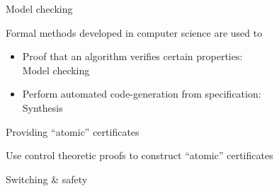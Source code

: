 \documentclass[usenames,dvipsnames,xcolor=table]{beamer}
\begin{document}
\begin{frame}{Model checking}
\begin{center}
Formal methods developed in computer science are used to 
\begin{itemize}
	\item Proof that an algorithm verifies certain properties: \\ Model checking
	\item Perform automated code-generation from specification: \\ Synthesis
\end{itemize}

\end{center}
\end{frame}


\begin{frame}{Providing ``atomic'' certificates }
\begin{center}
Use control theoretic proofs to construct ``atomic'' certificates

\begin{figure}
	\def\svgwidth{0.85\linewidth}
	
\end{figure}


\end{center}
\end{frame}



\begin{frame}{Switching \& safety}
\begin{center}

\begin{figure}
	\def\svgwidth{0.95\linewidth}
	{\larger[1]
	
	}
\end{figure}

\end{center}
\end{frame}
\end{document}
